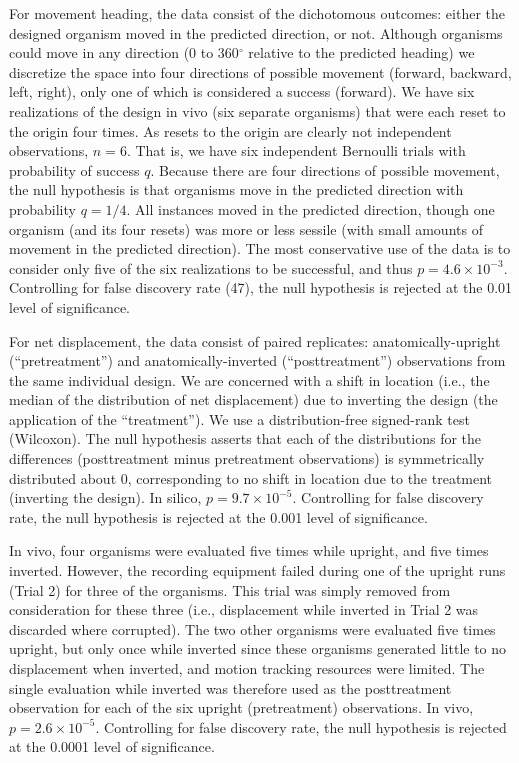 For movement heading, the data consist of the dichotomous outcomes: either the designed organism moved in the predicted direction, or not. 
Although organisms could move in any direction (0 to 360{$^{\circ}$} relative to the predicted heading) we discretize the space into four directions of possible movement (forward, backward, left, right), only one of which is considered a success (forward). 
We have six realizations of the design in vivo (six separate organisms) that were each reset to the origin four times. 
As resets to the origin are clearly not independent observations, $n = 6$. 
That is, we have six independent Bernoulli trials with probability of success $q$. 
Because there are four directions of possible movement, the null hypothesis is that organisms move in the predicted direction with probability $q = 1/4$. 
All instances moved in the predicted direction, though one organism (and its four resets) was more or less sessile (with small amounts of movement in the predicted direction). The most conservative use of the data is to consider only five of the six realizations to be successful, and thus $p = 4.6\times10^{-3}$. Controlling for false discovery rate (47), the null hypothesis is rejected at the 0.01 level of significance.

For net displacement, the data consist of paired replicates: anatomically-upright (``pretreatment'') and anatomically-inverted (``posttreatment'') observations from the same individual design. We are concerned with a shift in location (i.e., the median of the distribution of net displacement) due to inverting the design (the application of the ``treatment''). 
We use a distribution-free signed-rank test (Wilcoxon). 
The null hypothesis asserts that each of the distributions for the differences (posttreatment minus pretreatment observations) is symmetrically distributed about 0, corresponding to no shift in location due to the treatment (inverting the design). 
In silico, $p = 9.7\times10^{-5}$. 
Controlling for false discovery rate, the null hypothesis is rejected at the 0.001 level of significance.

In vivo, four organisms were evaluated five times while upright, and five times inverted. However, the recording equipment failed during one of the upright runs (Trial 2) for three of the organisms. 
This trial was simply removed from consideration for these three (i.e., displacement while inverted in Trial 2 was discarded where corrupted). 
The two other organisms were evaluated five times upright, but only once while inverted since these organisms generated little to no displacement when inverted, and motion tracking resources were limited. 
The single evaluation while inverted was therefore used as the posttreatment observation for each of the six upright (pretreatment) observations. 
In vivo, $p = 2.6\times10^{-5}$. 
Controlling for false discovery rate, the null hypothesis is rejected at the 0.0001 level of significance.

